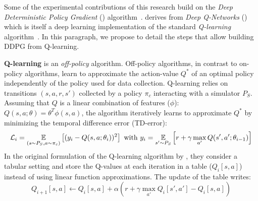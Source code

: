Some of the experimental contributions of this research build on the \textit{Deep Deterministic Policy Gradient} (\ddpg) algorithm~\citep{lillicrap2015continuous}. \ddpg derives from \textit{Deep Q-Networks} (\dqn) \citep{mnih2015human} which is itself a deep learning implementation of the standard \textit{Q-learning} algorithm~\citep{watkins_q-learning_1992}.  In this paragraph, we propose to detail the steps that allow building DDPG from Q-learning. 

\textbf{Q-learning} is an \textit{off-policy} \rl algorithm. Off-policy algorithms, in contrast to on-policy algorithms, learn to approximate the action-value $Q^*$ of an optimal policy independently of the policy used for data collection. Q-learning relies on transitions $(s,a,r,s')$ collected by a policy $\pi_c$ interacting with a simulator $P_S$. Assuming that $Q$ is a linear combination of features ($\phi$): $Q(s,a;\theta)=\theta^T\phi(s,a)$, the algorithm iteratively learns to approximate $Q^*$ by minimizing the temporal difference error (TD-error):
\begin{equation}
\mathcal{L}_i=\underset{(s\sim P_S, a\sim\pi_c)}{\mathbb{E}} \left[(y_i - Q(s,a;\theta_i))^2 \right] \text{ with } y_i = \underset{s'\sim P_S}{\mathbb{E}}\left[r +\gamma \max_{a'}Q(s',a';\theta_{i-1})\right] 
\label{eq:loss_td}
\end{equation}
In the original formulation of the Q-learning algorithm by \citet{watkins_q-learning_1992}, they consider a tabular setting and store the Q-values at each iteration in a table ($Q_i[s,a]$) instead of using linear function approximations. The update of the table writes:
\begin{equation}
Q_{i+1}[s,a] \leftarrow Q_i[s,a] + \alpha \left(r + \gamma\max_{a'}Q_i[s',a'] - Q_i[s,a]\right)
\end{equation}


